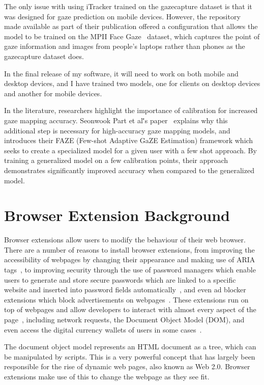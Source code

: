 \documentclass[twocolumn]{report}
\begin{document}
The only issue with using iTracker trained on the gazecapture dataset is that it was designed for gaze prediction on mobile devices. However, the repository~\cite{krafka2016eye,cheng2021survey} made available as part of their publication offered a configuration that allows the model to be trained on the MPII Face Gaze~\cite{zhang2019mpii} dataset, which captures the point of gaze information and images from people's laptops rather than phones as the gazecapture dataset does.

In the final release of my software, it will need to work on both mobile and desktop devices, and I have trained two models, one for clients on desktop devices and another for mobile devices.

In the literature, researchers highlight the importance of calibration for increased gaze mapping accuracy. Seonwook Part et al\.'s paper~\cite{seonwook2019fewshot} explains why this additional step is necessary for high-accuracy gaze mapping models, and introduces their FAZE (Few-shot Adaptive GaZE Estimation) framework which seeks to create a specialized model for a given user with a few shot approach. By training a generalized model on a few calibration points, their approach demonstrates significantly improved accuracy when compared to the generalized model. 

\section{Browser Extension Background}

Browser extensions allow users to modify the behaviour of their web browser. There are a number of reasons to install browser extensions, from improving the accessibility of webpages by changing their appearance and making use of ARIA tags~\cite{w3c2018accessible,lsdsoftware2024read}, to improving security through the use of password managers which enable users to generate and store secure passwords which are linked to a specific website and inserted into password fields automatically~\cite{lastpass}, and even ad blocker extensions which block advertisements on webpages~\cite{hill2014ublock}. These extensions run on top of webpages and allow developers to interact with almost every aspect of the page~\cite{frisbe2022building}, including network requests, the Document Object Model (DOM), and even access the digital currency wallets of users in some cases~\cite{finlay2015metamask}. 

The document object model represents an HTML document as a tree, which can be manipulated by scripts. This is a very powerful concept that has largely been responsible for the rise of dynamic web pages, also known as Web 2.0. Browser extensions make use of this to change the webpage as they see fit.  
\end{document}

